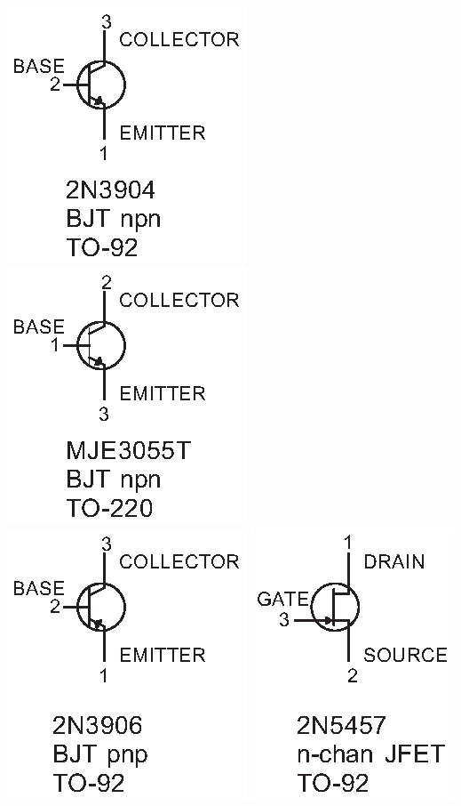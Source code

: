 \hspace{0.25in}
\includegraphics{appendices/pinouts/2N3904_pinout.eps}
\includegraphics{appendices/pinouts/MJE3055T_pinout.eps}
\includegraphics{appendices/pinouts/2N3906_pinout.eps}
\includegraphics{appendices/pinouts/2N5457_pinout.eps}

